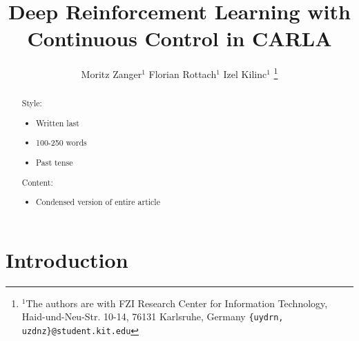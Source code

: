 \documentclass[letterpaper, 10 pt, conference]{ieeeconf}  %
\title{\LARGE \bf
Deep Reinforcement Learning with Continuous Control in CARLA
}
\author{Moritz Zanger$^{1}$ Florian Rottach$^{1}$ Izel Kilinc$^{1}$ %
\thanks{$^{1}$The authors are with FZI Research Center for Information Technology, Haid-und-Neu-Str. 10-14, 76131 Karlsruhe, Germany
        {\tt\small \{uydrn, uzdnz\}@student.kit.edu}}%
}
\begin{document}
\maketitle
\thispagestyle{empty}
\pagestyle{empty}


\begin{abstract}


Style:
\begin{itemize}
	\item Written last
	\item 100-250 words
	\item Past tense
\end{itemize}

Content:
\begin{itemize}
	\item Condensed version of entire article
\end{itemize}

\end{abstract}


\section{Introduction}

\end{document}
